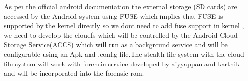   
  
 
  
  As per the official android documentation the external storage (SD cards) are accessed by the Android system using FUSE which implies that FUSE is supported by the kernel directly so we dont need to add fuse support in kernel , we need to develop the cloudfs which will be controlled by the Android Cloud Storage Service(ACCS)  which will run as a background service and will be configurable using an Apk and .config file.The stealth file system with the cloud file system will work with forensic service developed by aiyyappan and karthik and will be incorporated into the forensic rom.
  
  